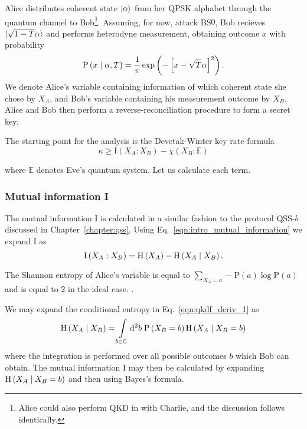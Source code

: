 
Alice distributes coherent state $\ket{\alpha}$ from her QPSK alphabet through the quantum channel to Bob\footnote{Alice could also perform QKD in \systemF \; with Charlie, and the discussion follows identically.}. Assuming, for now, attack BS$0$, Bob recieves $\ket{\sqrt{1-T}\alpha}$ and performs heterodyne measurement, obtaining outcome $x$ with probability
\begin{equation}
\text{P}\left(x\; \middle| \; \alpha, T\right) = \frac{1}{\pi}\exp\left( - \left[ x - \sqrt{T}\alpha\right]^2\right).
\end{equation}
We denote Alice's variable containing information of which coherent state she chose by $X_A$, and Bob's variable containing his measurement outcome by $X_B$. Alice and Bob then perform a reverse-reconciliation procedure \cite{Grosshans2002, Grosshans2003, Laudenbach2017} to form a secret key.

The starting point for the analysis is the Devetak-Winter key rate formula \cite{Devetak2004} 
\begin{equation}
\kappa \ge \text{I}\left(X_A : X_B\right) - \chi\left(X_B : \mathbb{E}\right)
\end{equation}

\noindent where $\mathbb{E}$ denotes Eve's quantum system. Let us calculate each term.

\subsubsection{Mutual information I}
The mutual information I is calculated in a similar fashion to the protocol QSS-$b$ discussed in Chapter~\ref{chapter:qss}. Using Eq.~\ref{eqn:intro_mutual_information} we expand $\text{I}$ as
\begin{equation}\label{eqn:qkdf_deriv_1}
\text{I}\left(X_A : X_B\right) = \text{H}\left(X_A\right) - \text{H}\left(X_A \; \middle| \; X_B\right).
\end{equation}

\noindent The Shannon entropy of Alice's variable is equal to $\sum_{X_A=a} - \text{P}\left(a\right) \log \text{P}\left(a\right)$ and is equal to $2$ in the ideal case. .

We may expand the conditional entropy in Eq.~\ref{eqn:qkdf_deriv_1} as
\begin{equation}\label{eqn:qkdf_deriv_2}
\text{H}\left(X_A \; \middle| \; X_B\right) = \int\limits_{b \in \mathbb{C}} \mathop{}\!\mathrm{d^2} b \; \text{P}\left(X_B=b\right) \text{H}\left(X_A \; \middle| \; X_B=b\right)
\end{equation}
where the integration is performed over all possible outcomes $b$ which Bob can obtain. The mutual information I may then be calculated by expanding $\text{H}\left(X_A \; \middle| \; X_B=b\right)$ and then using Bayes's formula. 

